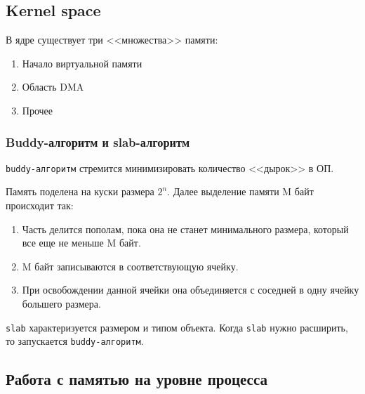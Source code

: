 
\subsection*{Kernel space}

В ядре существует три <<множества>> памяти:
\begin{enumerate}
\item Начало виртуальной памяти
\item Область DMA
\item Прочее
\end{enumerate}

\subsubsection*{Buddy-алгоритм и slab-алгоритм}
\verb!buddy-алгоритм! стремится минимизировать количество <<дырок>> в ОП.

Память поделена на куски размера $2^n$. Далее выделение памяти M байт происходит так:
\begin{enumerate}
\item Часть делится пополам, пока она не станет минимального размера, который все еще не меньше M байт.
\item M байт записываются в соответствующую ячейку.
\item При освобождении данной ячейки она объединяется с соседней в одну ячейку большего размера.
\end{enumerate}

\verb!slab! характеризуется размером и типом объекта. Когда \verb!slab! нужно расширить, то запускается \verb!buddy-алгоритм!.

\subsection*{Работа с памятью на уровне процесса}

